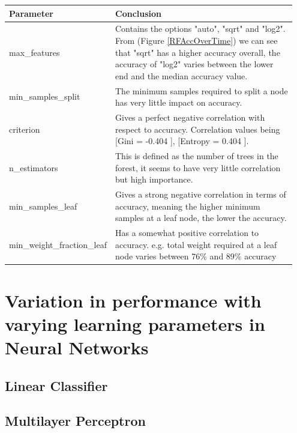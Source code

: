 \documentclass[11pt]{article}
\begin{document}
\begin{table}[ht]
  \centering
  \begin{tabular}{|p{0.25\linewidth} | p{0.7\linewidth}|} 
    \hline
    \textbf{Parameter}  & \textbf{Conclusion} \\ \hline
    max\_features & Contains the options "auto", "sqrt" and "log2". From (Figure \ref{RFAccOverTime}) we can see that "sqrt" has a higher accuracy overall, the accuracy of "log2" varies between the lower end and the median accuracy value.\\ \hline
    min\_samples\_split & The minimum samples required to split a node has very little impact on accuracy.  \\ \hline
    criterion & Gives a perfect negative correlation with respect to accuracy. Correlation values being [Gini = -0.404 ], [Entropy = 0.404 ]. \\ \hline
    n\_estimators & This is defined as the number of trees in the forest, it seems to have very little correlation but high importance. \\ \hline
    min\_samples\_leaf & Gives a strong negative correlation in terms of accuracy, meaning the higher minimum samples at a leaf node, the lower the accuracy. \\ \hline
    min\_weight\_fraction\_leaf & Has a somewhat positive correlation to accuracy. e.g. total weight required at a leaf node varies between 76\% and 89\% accuracy\\ \hline

  \end{tabular}
\end{table}\label{RF_Analysis_Table}


\newpage
\section{Variation in performance with varying learning parameters in Neural Networks}
\subsection{Linear Classifier}



\newpage
\subsection{Multilayer Perceptron}
\end{document}
